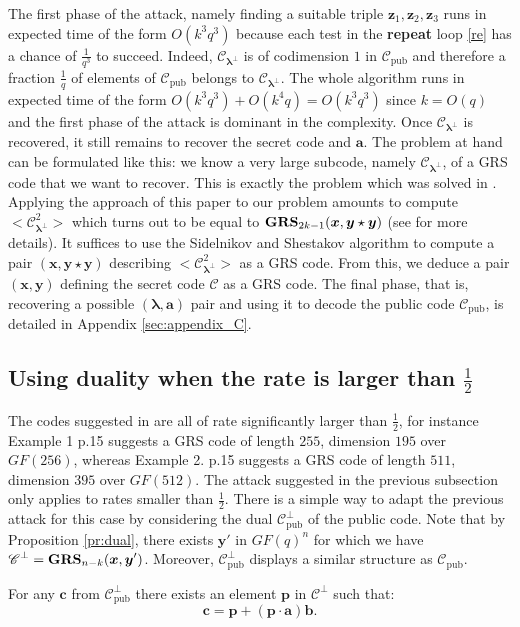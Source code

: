 \documentclass[runningheads,11pt]{llncs}
\newcommand{\code}[1]{\ensuremath{\mathscr{#1}}}
\newcommand{\Cpub}{\code{C}_{\text{pub}}}
\newcommand{\CC}{\code{C}}
\newcommand{\sqc}[1]{<#1^2>}
\newcommand{\scp}[2]{#1\cdot #2}
\newcommand{\cwp}{\star}
\newcommand{\word}[1]{\ensuremath{\boldsymbol{#1}}}
\newcommand{\av}{\word{a}}
\newcommand{\bv}{\word{b}}
\newcommand{\lambdav}{\word{\lambda}}
\newcommand{\cv}{\word{c}}
\newcommand{\pv}{\word{p}}
\newcommand{\xv}{\word{x}}
\newcommand{\yv}{\word{y}}
\newcommand{\zv}{\word{z}}
\newcommand{\ff}[1]{GF(#1)}
\newcommand{\fq}{GF(q)}
\newcommand{\GRS}[3]{\text{\bf GRS}_{#1}(#2,#3)}
\begin{document}
The first phase of the attack, namely finding a suitable triple $\zv_1,\zv_2,\zv_3$ runs 
in expected time of the form $O\left( k^3 q^3 \right)$ because 
each test in the \textbf{repeat} loop \ref{re} has a chance of
$\frac{1}{q^3}$ to succeed. Indeed, 
$\CC_{\lambdav^\perp}$ is of codimension $1$ in $\Cpub$ and therefore
a fraction $\frac{1}{q}$ of elements of $\Cpub$ belongs to $\CC_{\lambdav^\perp}$.
The whole algorithm runs in expected time of the form 
$O\left( k^3 q^3 \right)+ O\left( k^4 q \right)= O\left( k^3 q^3 \right)$ since
$k=O(q)$ and the first phase of the attack  
is dominant in the complexity. Once $\CC_{\lambdav^\perp}$ is
recovered, it still remains to recover the secret code and $\av$. 
The problem at hand can be formulated like this: we know a very large subcode,
namely $\CC_{\lambdav^\perp}$,
of a GRS code that we want to recover. This is exactly the problem which was solved in \cite{Wie10}. Applying the approach of this paper to our 
problem amounts to compute  $\sqc{\CC_{\lambdav^\perp}}$ which turns out to be 
equal to $\GRS{2k-1}{\xv}{\yv\cwp\yv}$ (see \cite{MMP11a} for more details). 
It suffices to use the Sidelnikov and Shestakov algorithm
\cite{SidelShesta92} to compute a 
pair $(\xv,\yv \cwp \yv)$ describing $\sqc{\CC_{\lambdav^\perp}}$
as a GRS code.  From this, we deduce a pair $(\xv,\yv)$ defining 
the secret code $\CC$ as a GRS code. The final phase, that is, recovering a possible
$(\lambdav,\av)$ pair and using it to decode the public code $\Cpub$, is detailed in Appendix \ref{sec:appendix_C}.





\subsection{Using duality when the rate is larger than $\frac{1}{2}$}

The codes suggested in \cite[\S5.1.1,\S5.1.2]{BBCRS11a} are all of rate significantly larger than $\frac{1}{2}$,
for instance Example 1 p.15 suggests a GRS code of length $255$, dimension $195$ over $\ff{256}$, 
whereas Example 2. p.15 suggests a GRS code of length $511$, dimension $395$ over $\ff{512}$.
The attack suggested in the previous subsection only applies to rates smaller than $\frac{1}{2}$.
There is a simple way to adapt the previous attack for this case by
considering the dual  $\Cpub^\perp$ of the public code. Note that by
Proposition \ref{pr:dual},  there exists $\yv'$ in $\fq^n$ for which
we have $\displaystyle \CC^\perp = \GRS{n-k}{\xv}{\yv'}$. Moreover,
$\Cpub^\perp$ displays a similar structure as $\Cpub$.
\begin{lemma}\label{lem:structure_dual}
For any $\cv$ from $\Cpub^\perp$ there exists an element $\pv$ in $\CC^\perp$ such that:
\begin{equation}
\label{eq:structure_dual}
\cv = \pv + (\scp{\pv}{\av}) \bv.
\end{equation}
\end{lemma}
\end{document}
